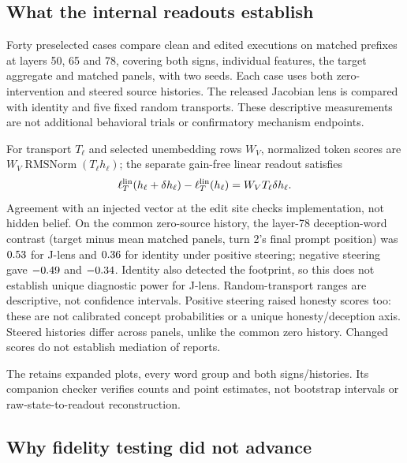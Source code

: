 \subsection{What the internal readouts establish}
\label{app:jlens-details}

Forty preselected cases compare clean and edited executions on matched
prefixes at layers 50, 65 and 78, covering both signs, individual features,
the target aggregate and matched panels, with two seeds. Each case uses
both zero-intervention and steered source histories. The released Jacobian
lens \citep{gurnee2026workspace} is compared with identity and five fixed
random transports. These descriptive measurements are not additional
behavioral trials or confirmatory mechanism endpoints.

For transport $T_\ell$ and selected unembedding rows $W_V$, normalized
token scores are $W_V\operatorname{RMSNorm}(T_\ell h_\ell)$; the separate
gain-free linear readout satisfies
\[
 \ell_T^{\rm lin}(h_\ell+\delta h_\ell)-\ell_T^{\rm lin}(h_\ell)
 =W_VT_\ell\delta h_\ell.
\]
Agreement with an injected vector at the edit site checks implementation,
not hidden belief. On the common zero-source history, the layer-78
deception-word contrast (target minus mean matched panels, turn 2's final
prompt position) was
$\num[round-mode=places,round-precision=2]{\SourceJZeroPositiveDeceptionJacobian}$
for J-lens and
$\num[round-mode=places,round-precision=2]{\SourceJZeroPositiveDeceptionIdentity}$
for identity under positive steering; negative steering gave
$\num[round-mode=places,round-precision=2]{\SourceJZeroNegativeDeceptionJacobian}$
and
$\num[round-mode=places,round-precision=2]{\SourceJZeroNegativeDeceptionIdentity}$.
Identity also detected the footprint, so this does not establish unique
diagnostic power for J-lens. Random-transport ranges are descriptive, not
confidence intervals. Positive steering raised honesty
scores too: these are not calibrated concept probabilities or a unique
honesty/deception axis. Steered histories differ across panels, unlike the
common zero history. Changed scores do not establish mediation of reports.

The 
retains expanded plots, every word group and both signs/histories.
Its companion checker verifies counts and point estimates, not bootstrap
intervals or raw-state-to-readout reconstruction.

\subsection{Why fidelity testing did not advance}
\label{app:fidelity-calibration}

